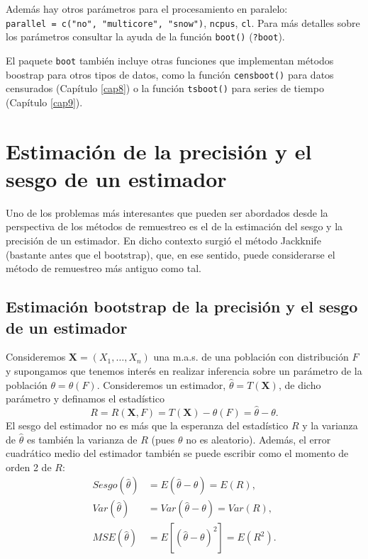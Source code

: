 \documentclass[]{book}
\theoremstyle{definition}
\theoremstyle{definition}
\theoremstyle{definition}
\theoremstyle{remark}
\begin{document}
Además hay otros parámetros para el procesamiento en paralelo:
\texttt{parallel\ =\ c("no",\ "multicore",\ "snow")}, \texttt{ncpus},
\texttt{cl}. Para más detalles sobre los parámetros consultar la ayuda
de la función \texttt{boot()} (\texttt{?boot}).

El paquete \texttt{boot} también incluye otras funciones que implementan
métodos boostrap para otros tipos de datos, como la función
\texttt{censboot()} para datos censurados (Capítulo \ref{cap8}) o la
función \texttt{tsboot()} para series de tiempo (Capítulo \ref{cap9}).

\chapter{Estimación de la precisión y el sesgo de un
estimador}\label{cap2}

Uno de los problemas más interesantes que pueden ser abordados desde la
perspectiva de los métodos de remuestreo es el de la estimación del
sesgo y la precisión de un estimador. En dicho contexto surgió el método
Jackknife (bastante antes que el bootstrap), que, en ese sentido, puede
considerarse el método de remuestreo más antiguo como tal.

\section{Estimación bootstrap de la precisión y el sesgo de un
estimador}\label{cap2-boot}

Consideremos \(\mathbf{X}=\left( X_1,\ldots ,X_n \right)\) una m.a.s. de
una población con distribución \(F\) y supongamos que tenemos interés en
realizar inferencia sobre un parámetro de la población
\(\theta =\theta \left( F \right)\). Consideremos un estimador,
\(\hat{\theta}=T\left( \mathbf{X} \right)\), de dicho parámetro y
definamos el estadístico
\[R=R\left( \mathbf{X}, F \right) = T\left( \mathbf{X} \right) 
- \theta \left( F \right) = \hat{\theta} - \theta.\] El sesgo del
estimador no es más que la esperanza del estadístico \(R\) y la varianza
de \(\hat{\theta}\) es también la varianza de \(R\) (pues \(\theta\) no
es aleatorio). Además, el error cuadrático medio del estimador también
se puede escribir como el momento de orden 2 de \(R\): \[\begin{aligned}
Sesgo\left( \hat{\theta} \right) &= E\left( \hat{\theta}-\theta \right)
=E\left( R \right), \\
Var\left( \hat{\theta} \right) &= Var\left( \hat{\theta}-\theta \right)
=Var\left( R \right), \\
MSE\left( \hat{\theta} \right) &= E\left[ \left( \hat{\theta}-\theta \right)
^2\right] =E\left( R^2 \right).
\end{aligned}\]
\end{document}
